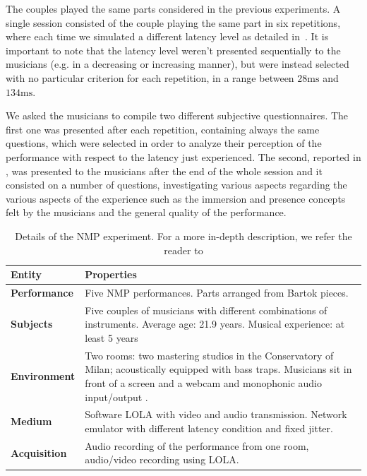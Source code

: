 The couples played the same parts considered in the previous experiments. A single session consisted of the couple playing the same part in six repetitions, where each time we simulated a different latency level as detailed in~\cite{CIM2018}. It is important to note that the latency level weren't presented sequentially to the musicians (e.g. in a decreasing or increasing manner), but were instead selected with no particular criterion for each repetition, in a range between $28\mathrm{ms}$ and $134\mathrm{ms}$.

We asked the musicians to compile two different subjective questionnaires. The first one was presented  after each repetition, containing always the same questions, which were selected in order to analyze their perception of the performance with respect to the latency just experienced. The second, reported in \cite{CIM2018}, was presented to the musicians after the end of the whole session and it consisted on a number of questions, investigating various aspects regarding the various aspects of the experience such as the immersion and presence concepts felt by the musicians and the general quality of the performance.












\begin{table}
	\centering
	\caption{Details of the NMP experiment. For a more in-depth description, we refer the reader to \cite{CIM2018} }
	\begin{tabular}{p{1.5cm}p{6cm}}
		\hline
		\textbf{Entity} & \textbf{Properties} \\
		\hline
		\textbf{Performance} & Five NMP performances. \newline  Parts arranged from Bartok pieces. \\
		\textbf{Subjects} & Five couples of musicians with different combinations of instruments. Average age: 21.9 years. Musical experience: at least 5 years\\
		\textbf{Environment} & Two rooms: two mastering studios in the Conservatory of Milan; acoustically equipped with bass traps. Musicians sit in front of a screen and a webcam and monophonic audio input/output .\\
		\textbf{Medium} & Software LOLA with video and audio transmission. Network emulator with different latency condition and fixed jitter. \\
		\textbf{Acquisition} & Audio recording of the performance from one room, audio/video recording using LOLA.\\
		\hline
	\end{tabular}
	\label{tab:exp2}
\end{table}


